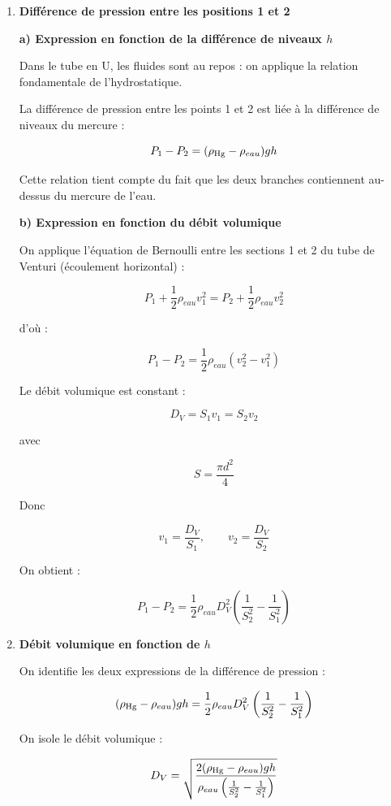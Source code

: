 \documentclass[a4paper,11pt,fleqn]{scrartcl}%
\begin{document}
\begin{enumerate}

\item \textbf{Différence de pression entre les positions 1 et 2}

\textbf{a) Expression en fonction de la différence de niveaux $h$}

Dans le tube en U, les fluides sont au repos : on applique la relation fondamentale de l'hydrostatique.

La différence de pression entre les points 1 et 2 est liée à la différence de niveaux du mercure :

\[
P_1 - P_2 = (\rho_{\ce{Hg}}-\rho_{eau}) g h
\]

Cette relation tient compte du fait que les deux branches contiennent au-dessus du mercure de l'eau.

\bigskip

\textbf{b) Expression en fonction du débit volumique}

On applique l'équation de Bernoulli entre les sections 1 et 2 du tube de Venturi (écoulement horizontal) :

\[
P_1 + \frac12 \rho_{eau} v_1^2
=
P_2 + \frac12 \rho_{eau} v_2^2
\]

d'où :

\[
P_1 - P_2 = \frac12 \rho_{eau}(v_2^2-v_1^2)
\]

Le débit volumique est constant :

\[
D_V = S_1 v_1 = S_2 v_2
\]

avec

\[
S = \frac{\pi d^2}{4}
\]

Donc

\[
v_1 = \frac{D_V}{S_1}, \qquad v_2 = \frac{D_V}{S_2}
\]

On obtient :

\[
P_1-P_2 =
\frac12 \rho_{eau} D_V^2
\left(
\frac{1}{S_2^2}-\frac{1}{S_1^2}
\right)
\]

\bigskip

\item \textbf{Débit volumique en fonction de $h$}

On identifie les deux expressions de la différence de pression :

\[
(\rho_{\ce{Hg}}-\rho_{eau})gh
=
\frac12 \rho_{eau} D_V^2
\left(
\frac{1}{S_2^2}-\frac{1}{S_1^2}
\right)
\]

On isole le débit volumique :

\[
D_V =
\sqrt{
\frac{2(\rho_{\ce{Hg}}-\rho_{eau})gh}
{\rho_{eau}
\left(\frac{1}{S_2^2}-\frac{1}{S_1^2}\right)}
}
\]


\end{enumerate}
\end{document}
